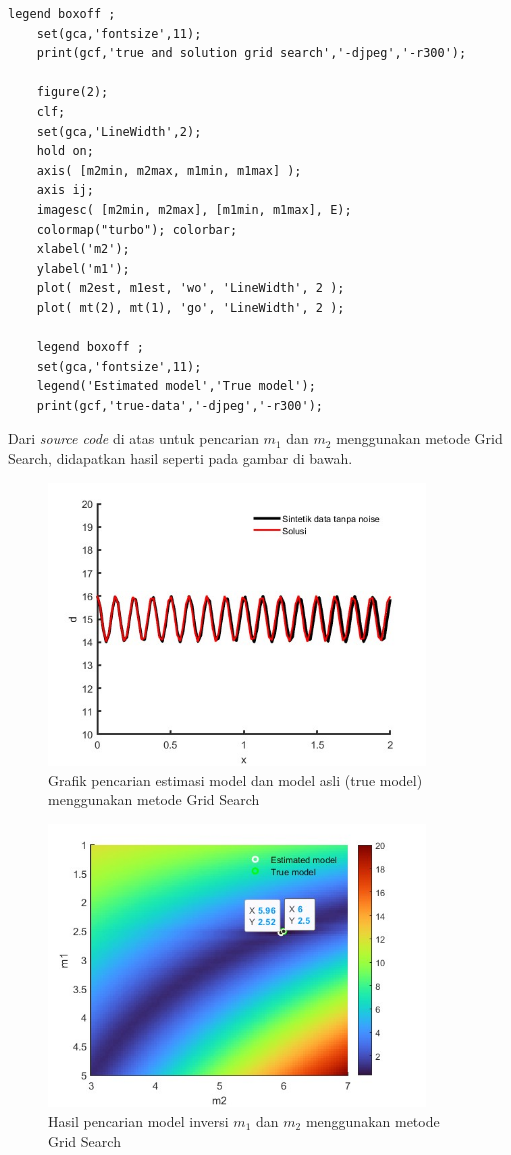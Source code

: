 \documentclass{article}
\begin{document}
\begin{lstlisting}[caption={\textbf{gridsearch\textunderscore nonoise.m}}]
    legend boxoff ;
    set(gca,'fontsize',11);
    print(gcf,'true and solution grid search','-djpeg','-r300');
    
    figure(2);
    clf;
    set(gca,'LineWidth',2);
    hold on;
    axis( [m2min, m2max, m1min, m1max] );
    axis ij;
    imagesc( [m2min, m2max], [m1min, m1max], E);
    colormap("turbo"); colorbar;
    xlabel('m2');
    ylabel('m1');
    plot( m2est, m1est, 'wo', 'LineWidth', 2 );
    plot( mt(2), mt(1), 'go', 'LineWidth', 2 );
        
    legend boxoff ;
    set(gca,'fontsize',11);
    legend('Estimated model','True model');
    print(gcf,'true-data','-djpeg','-r300'); 

\end{lstlisting}
Dari \textit{source code} di atas untuk pencarian $m_1$ dan $m_2$ menggunakan metode Grid Search, didapatkan hasil seperti pada gambar di bawah.
\begin{figure}[h]
    \centering
    \includegraphics[width=10cm]{figure/gs true solution no noise.jpg}
    \caption{Grafik pencarian estimasi model dan model asli (true model) menggunakan metode Grid Search}
    \label{fig:gs true sol}
\end{figure}
\begin{figure}
    \centering
    \includegraphics[width=10cm]{figure/gs true model no noise.jpg}
    \caption{Hasil pencarian model inversi $m_1$ dan $m_2$ menggunakan metode Grid Search}
    \label{fig:gs true mod}
\end{figure}
\end{document}
